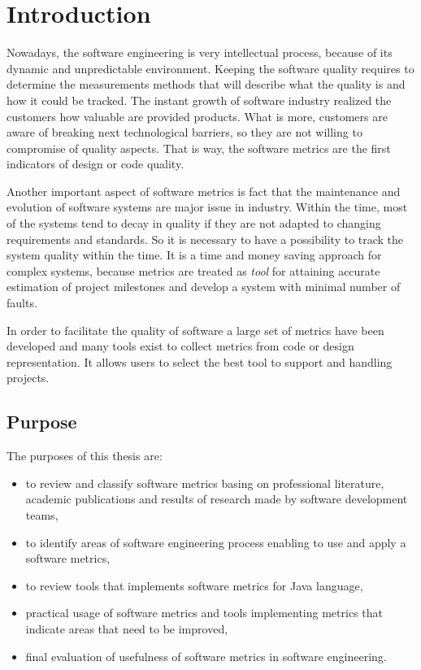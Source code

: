 \chapter{Introduction} \label{roz:wstep}
Nowadays, the software engineering is very intellectual process, because of its dynamic and unpredictable environment. Keeping the software quality requires to determine the measurements methods that will describe what the quality is and how it could be tracked.  The instant growth of software industry realized the customers how valuable are provided products. What is more, customers are aware of breaking next technological barriers, so they are not willing to compromise of quality aspects. That is way, the software metrics are the first indicators of design or code quality.
 
Another important aspect of software metrics is fact that the maintenance and evolution of software systems are major issue in industry. Within the time, most of the systems tend to decay in quality if they are not adapted to changing requirements and standards. So it is necessary to have a possibility to track the system quality within the time. It is a time and money saving approach for complex systems, because metrics are treated as \textit{tool} for attaining accurate estimation of project milestones and develop a system with minimal number of faults. 
 
In order to facilitate the quality of software a large set of metrics have been developed and many tools exist to collect metrics from code or design representation. It allows users to select the best tool to support and handling projects.

\section{Purpose}
The purposes of this thesis are:

\begin{itemize}
\item to review and classify software metrics basing on professional literature, academic publications and results of research made by software development teams, 
\item to identify areas of software engineering process enabling to use and apply a software metrics,
\item to review tools that implements software metrics for Java language,
\item practical usage of software metrics and tools implementing metrics that indicate areas that need to be improved, 
\item final evaluation of usefulness of software metrics in software engineering. 
\end{itemize}

